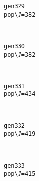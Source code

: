 \documentclass[11pt]{article}
\begin{document}
    \begin{Verbatim}[commandchars=\\\{\}]
gen329
pop\#=382

    \end{Verbatim}

    \begin{center}
    \end{center}
    { \hspace*{\fill} \\}
    
    \begin{Verbatim}[commandchars=\\\{\}]
gen330
pop\#=382

    \end{Verbatim}

    \begin{center}
    \end{center}
    { \hspace*{\fill} \\}
    
    \begin{Verbatim}[commandchars=\\\{\}]
gen331
pop\#=434

    \end{Verbatim}

    \begin{center}
    \end{center}
    { \hspace*{\fill} \\}
    
    \begin{Verbatim}[commandchars=\\\{\}]
gen332
pop\#=419

    \end{Verbatim}

    \begin{center}
    \end{center}
    { \hspace*{\fill} \\}
    
    \begin{Verbatim}[commandchars=\\\{\}]
gen333
pop\#=415

    \end{Verbatim}
\end{document}
